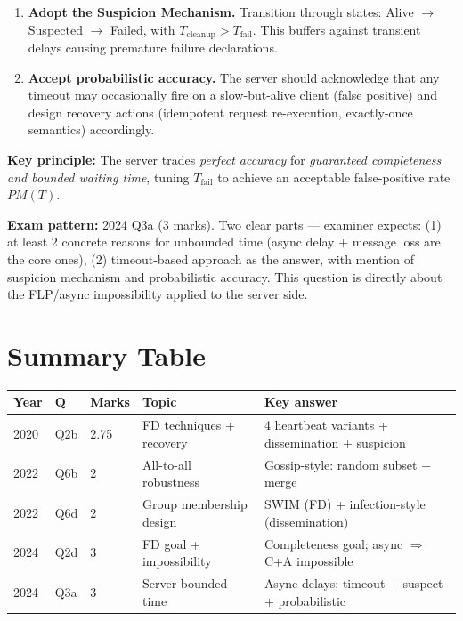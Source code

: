 \documentclass[12pt,a4paper]{article}
\begin{document}
\begin{solbox}
\begin{enumerate}
  \item \textbf{Adopt the Suspicion Mechanism.}
        Transition through states: Alive $\to$ Suspected $\to$ Failed, with
        $T_{\text{cleanup}} > T_{\text{fail}}$.
        This buffers against transient delays causing premature failure declarations.

  \item \textbf{Accept probabilistic accuracy.}
        The server should acknowledge that any timeout may occasionally fire on a
        slow-but-alive client (false positive) and design recovery actions
        (idempotent request re-execution, exactly-once semantics) accordingly.
\end{enumerate}

\textbf{Key principle:} The server trades \emph{perfect accuracy} for
\emph{guaranteed completeness and bounded waiting time}, tuning $T_{\text{fail}}$
to achieve an acceptable false-positive rate $PM(T)$.
\end{solbox}

\begin{notesbox}
\textbf{Exam pattern:} 2024 Q3a (3 marks). Two clear parts — examiner expects:
(1) at least 2 concrete reasons for unbounded time (async delay + message loss are
the core ones), (2) timeout-based approach as the answer, with mention of
suspicion mechanism and probabilistic accuracy.
This question is directly about the FLP/async impossibility applied to the server side.
\end{notesbox}

\newpage
\section{Summary Table}

\begin{center}
\renewcommand{\arraystretch}{1.35}
\begin{tabular}{lllll}
\toprule
\textbf{Year} & \textbf{Q} & \textbf{Marks} & \textbf{Topic} & \textbf{Key answer} \\
\midrule
2020 & Q2b & 2.75 & FD techniques + recovery & 4 heartbeat variants + dissemination + suspicion \\
2022 & Q6b & 2 & All-to-all robustness & Gossip-style: random subset + merge \\
2022 & Q6d & 2 & Group membership design & SWIM (FD) + infection-style (dissemination) \\
2024 & Q2d & 3 & FD goal + impossibility & Completeness goal; async $\Rightarrow$ C+A impossible \\
2024 & Q3a & 3 & Server bounded time & Async delays; timeout + suspect + probabilistic \\
\bottomrule
\end{tabular}
\end{center}
\end{document}

